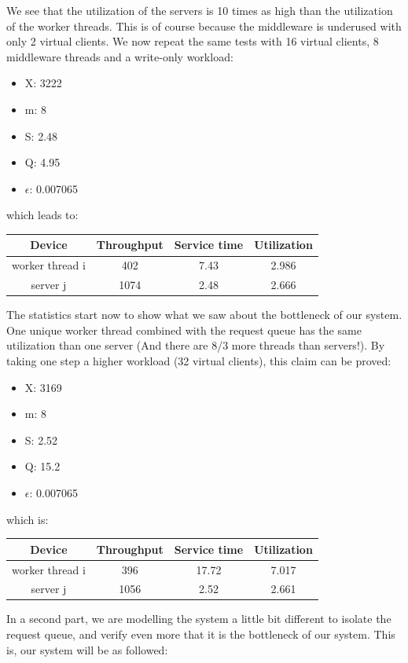 \documentclass[11pt,a4paper]{article}
\begin{document}
We see that the utilization of the servers is 10 times as high than the utilization of the worker threads. This is of course because the middleware is underused with only 2 virtual clients. We now repeat the same tests with 16 virtual clients, 8 middleware threads and a write-only workload:
\begin{itemize}
\item X: 3222
\item m: 8
\item S: 2.48
\item Q: 4.95
\item \(\epsilon \): 0.007065
\end{itemize}
which leads to:
\begin{center}
		\begin{tabular}{|c|c|c|c|}
			  \hline
			  \textbf{Device} & \textbf{Throughput} & \textbf{Service time} & \textbf{Utilization} \\
			  \hline
			  worker thread i  &402  & 7.43  &2.986\\
			  server j & 1074 & 2.48 &2.666 \\
			  \hline
		\end{tabular}
 \end{center}
The statistics start now to show what we saw about the bottleneck of our system. One unique worker thread combined with the request queue has the same utilization than one server (And there are 8/3 more threads than servers!). By taking one step a higher workload (32 virtual clients), this claim can be proved:
\begin{itemize}
\item X: 3169
\item m: 8
\item S: 2.52
\item Q: 15.2
\item \(\epsilon \): 0.007065
\end{itemize}
which is:
\begin{center}
		\begin{tabular}{|c|c|c|c|}
			  \hline
			  \textbf{Device} & \textbf{Throughput} & \textbf{Service time} & \textbf{Utilization} \\
			  \hline
			  worker thread i  &396  & 17.72  &7.017\\
			  server j & 1056 & 2.52 &2.661 \\
			  \hline
		\end{tabular}
\end{center}
In a second part, we are modelling the system a little bit different to isolate the request queue, and verify even more that it is the bottleneck of our system. This is, our system will be as followed:
\end{document}
